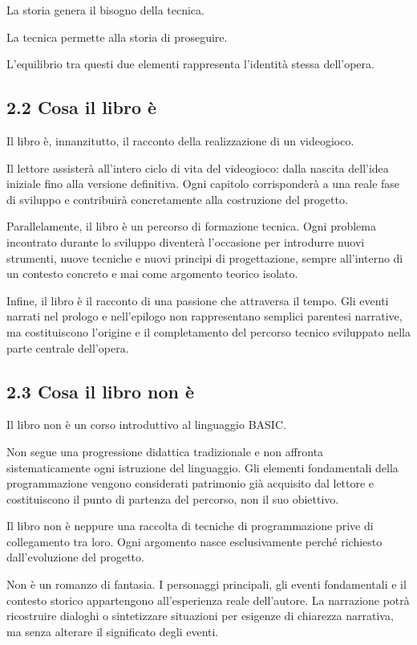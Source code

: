 \documentclass{article}
\begin{document}
La storia genera il bisogno della tecnica.

La tecnica permette alla storia di proseguire.

L'equilibrio tra questi due elementi rappresenta l'identità stessa dell'opera.

\subsection{2.2 Cosa il libro è}
Il libro è, innanzitutto, il racconto della realizzazione di un videogioco.

Il lettore assisterà all'intero ciclo di vita del videogioco: dalla nascita dell'idea iniziale fino alla versione
definitiva. Ogni capitolo corrisponderà a una reale fase di sviluppo e contribuirà concretamente alla costruzione del
progetto.

Parallelamente, il libro è un percorso di formazione tecnica. Ogni problema incontrato durante lo sviluppo diventerà
l'occasione per introdurre nuovi strumenti, nuove tecniche e nuovi principi di progettazione, sempre all'interno di un
contesto concreto e mai come argomento teorico isolato.

Infine, il libro è il racconto di una passione che attraversa il tempo. Gli eventi narrati nel prologo e nell'epilogo
non rappresentano semplici parentesi narrative, ma costituiscono l'origine e il completamento del percorso tecnico
sviluppato nella parte centrale dell'opera.

\subsection{2.3 Cosa il libro non è}
Il libro non è un corso introduttivo al linguaggio BASIC.

Non segue una progressione didattica tradizionale e non affronta sistematicamente ogni istruzione del linguaggio. Gli
elementi fondamentali della programmazione vengono considerati patrimonio già acquisito dal lettore e costituiscono il
punto di partenza del percorso, non il suo obiettivo.

Il libro non è neppure una raccolta di tecniche di programmazione prive di collegamento tra loro. Ogni argomento nasce
esclusivamente perché richiesto dall'evoluzione del progetto.

Non è un romanzo di fantasia. I personaggi principali, gli eventi fondamentali e il contesto storico appartengono
all'esperienza reale dell'autore. La narrazione potrà ricostruire dialoghi o sintetizzare situazioni per esigenze di
chiarezza narrativa, ma senza alterare il significato degli eventi.
\end{document}
